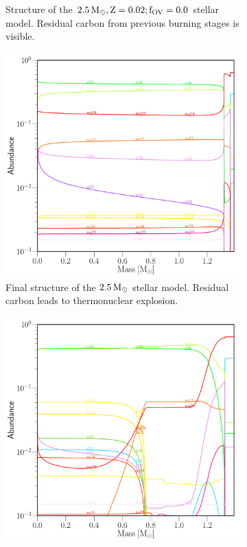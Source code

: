 \documentclass[../../main/thesis_msc.tex]{subfiles}
\begin{document}
\begin{figure}
\begin{subfigure}[b]{.45\linewidth}
\caption{Structure of the $\rm 2.5\, M_{\odot},  Z=0.02;f_{OV}=0.0$ stellar model. Residual carbon from previous burning stages is visible.}\label{fig:abun_b}
\end{subfigure}
\hfill
\begin{subfigure}[b]{.45\linewidth}
 \includegraphics[width=\textwidth]{../figures/chapter4/2p5_final_abun.pdf}
\caption{Final structure of the $\rm 2.5\, M_{\odot}$ stellar model. Residual carbon leads to thermonuclear explosion.}\label{fig:abun_c}
\hfill
\end{subfigure}
\hfill
\begin{subfigure}[b]{.45\linewidth}
\includegraphics[width=\textwidth]{../figures/chapter4/2p5_abun_carbon_sup.pdf}

\end{subfigure}
\end{figure}
\end{document}

